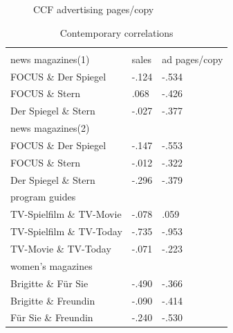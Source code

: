 \documentclass[12pt,a4paper,notitlepage]{article}
\begin{document}
\begin{figure}[H]\centering
\caption{CCF advertising pages/copy}
	\label{fig_ccf_ads_fss}
\end{figure}


\begin{table}[!htbp] \centering
	\caption{Contemporary correlations}
	\label{tab_CCF}
\begin{tabular}{@{\extracolsep{5pt}} lll}
\\[-1.8ex]\hline 
\hline \\[-1.8ex]
	news magazines(1) & sales & ad pages/copy \\
	\hline
	FOCUS \& Der Spiegel & -.124 & -.534 \\
	FOCUS \& Stern & .068 & -.426 \\
	Der Spiegel \& Stern & -.027 & -.377 \\
	\hline
	news magazines(2) & & \\
	\hline
	FOCUS \& Der Spiegel & -.147 & -.553 \\
	FOCUS \& Stern & -.012 & -.322 \\
	Der Spiegel \& Stern & -.296 & -.379 \\
	\hline
	program guides & & \  \\ 
	\hline
	TV-Spielfilm \& TV-Movie & -.078 & .059 \\
	TV-Spielfilm \& TV-Today & -.735 & -.953 \\
	TV-Movie \& TV-Today & -.071 & -.223 \\ 
	\hline
	women's magazines &  & \  \\ 
	\hline
	Brigitte \& Für Sie & -.490 & -.366 \\ 
	Brigitte \& Freundin & -.090 & -.414 \\ 
	Für Sie \& Freundin & -.240 & -.530 \\ \hline
\end{tabular}
	\end{table}
\end{document}
